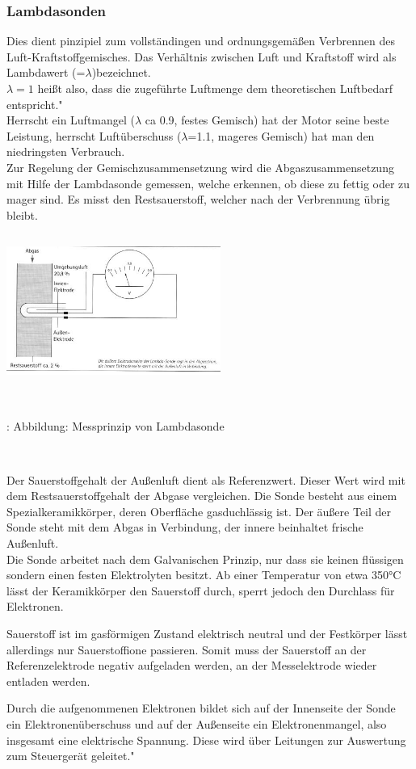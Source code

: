			\subsubsection{Lambdasonden}
				Dies dient pinzipiel zum vollständingen und ordnungsgemäßen Verbrennen des Luft-Kraftstoffgemisches. Das Verhältnis zwischen Luft und Kraftstoff wird als Lambdawert (=$\lambda$)bezeichnet.\\
				$\lambda = 1$ heißt also, dass die zugeführte Luftmenge dem theoretischen Luftbedarf entspricht."\cite{TS29}\\
				Herrscht ein Luftmangel ($\lambda$ ca 0.9, festes Gemisch) hat der Motor seine beste Leistung, herrscht Luftüberschuss ($\lambda$=1.1, mageres Gemisch) hat man den niedringsten Verbrauch.\\
				Zur Regelung der Gemischzusammensetzung wird die Abgaszusammensetzung mit Hilfe der Lambdasonde gemessen, welche erkennen, ob diese zu fettig oder zu mager sind. Es misst den Restsauerstoff, welcher nach der Verbrennung übrig bleibt. 			
			
				\begin{center}
					\includegraphics[width=7cm, height=5cm] {lambdasonde.png}
					\caption {\\\cite{TS30}: Abbildung: Messprinzip von Lambdasonde}
				\end{center}\\
			
				\begin{flushleft}
					Der Sauerstoffgehalt der Außenluft dient als Referenzwert. Dieser Wert wird mit dem Restsauerstoffgehalt der Abgase vergleichen. Die Sonde besteht aus einem Spezialkeramikkörper, deren Oberfläche gasduchlässig ist. Der äußere Teil der Sonde steht mit dem Abgas in Verbindung, der innere beinhaltet frische Außenluft.\\
					Die Sonde arbeitet nach dem Galvanischen Prinzip, nur dass sie keinen flüssigen sondern einen festen Elektrolyten besitzt. Ab einer Temperatur von etwa 350°C lässt der Keramikkörper den Sauerstoff durch, sperrt jedoch den Durchlass für Elektronen.
					
					Sauerstoff ist im gasförmigen Zustand elektrisch neutral und der Festkörper lässt allerdings nur Sauerstoffione passieren. Somit muss der Sauerstoff an der Referenzelektrode negativ aufgeladen werden, an der Messelektrode wieder entladen werden.
					
					Durch die aufgenommenen Elektronen bildet sich auf der Innenseite der Sonde ein Elektronenüberschuss und auf der Außenseite ein Elektronenmangel, also insgesamt eine elektrische Spannung. Diese wird über Leitungen zur Auswertung zum Steuergerät geleitet."\cite{TS31}
				\end{flushleft}
			
